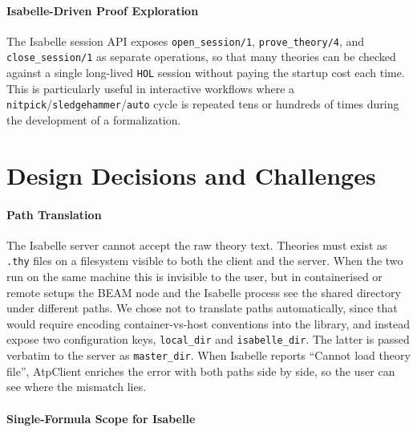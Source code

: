 \documentclass[]{ceurart}
\begin{document}
\paragraph{Isabelle-Driven Proof Exploration}

The Isabelle session API exposes \texttt{open_session/1}, \texttt{prove_theory/4}, and \texttt{close_session/1} as separate operations, so that many theories can be checked against a single long-lived \texttt{HOL} session without paying the startup cost each time. This is particularly useful in interactive workflows where a \texttt{nitpick}/\texttt{sledgehammer}/\texttt{auto} cycle is repeated tens or hundreds of times during the development of a formalization.

\section{Design Decisions and Challenges}\label{sec:7}

\paragraph{Path Translation}

The Isabelle server cannot accept the raw theory text. Theories must exist as \texttt{.thy} files on a filesystem visible to both the client and the server. When the two run on the same machine this is invisible to the user, but in containerised or remote setups the BEAM node and the Isabelle process see the shared directory under different paths. We chose not to translate paths automatically, since that would require encoding container-vs-host conventions into the library, and instead expose two configuration keys, \texttt{local\_dir} and \texttt{isabelle\_dir}. The latter is passed verbatim to the server as \texttt{master\_dir}. When Isabelle reports ``Cannot load theory file'', AtpClient enriches the error with both paths side by side, so the user can see where the mismatch lies.

\paragraph{Single-Formula Scope for Isabelle}
\end{document}
